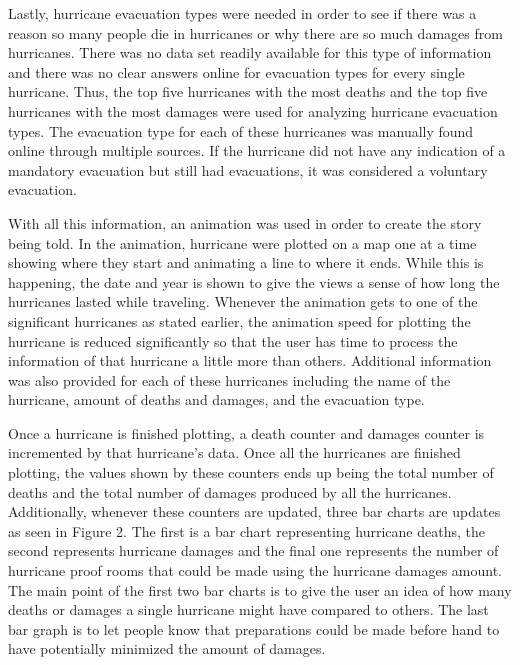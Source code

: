 Lastly, hurricane evacuation types were needed in order to see if there was a reason so many people die in hurricanes or why there are so much damages from hurricanes. There was no data set readily available for this type of information and there was no clear answers online for evacuation types for every single hurricane. Thus, the top five hurricanes with the most deaths and the top five hurricanes with the most damages were used for analyzing hurricane evacuation types. The evacuation type for each of these hurricanes was manually found online through multiple sources. If the hurricane did not have any indication of a mandatory evacuation but still had evacuations, it was considered a voluntary evacuation. 

With  all this information, an animation was used in order to create the story being told. In the animation, hurricane were plotted on a map one at a time showing where they start and animating a line to where it ends. While this is happening, the date and year is shown to give the views a sense of how long the hurricanes lasted while traveling. Whenever the animation gets to one of the significant hurricanes as stated earlier, the animation speed for plotting the hurricane is reduced significantly so that the user has time to process the information of that hurricane a little more than others. Additional information was also provided for each of these hurricanes including the name of the hurricane, amount of deaths and damages, and the evacuation type.

Once a hurricane is finished plotting, a death counter and damages counter is incremented by that hurricane's data. Once all the hurricanes are finished plotting, the values shown by these counters ends up being the total number of deaths and the total number of damages produced by all the hurricanes. Additionally, whenever these counters are updated, three bar charts are updates as seen in Figure 2. The first is a bar chart representing hurricane deaths, the second represents hurricane damages and the final one represents the number of hurricane proof rooms that could be made using the hurricane damages amount. The main point of the first two bar charts is to give the user an idea of how many deaths or damages a single hurricane might have compared to others. The last bar graph is to let people know that preparations could be made before hand to have potentially minimized the amount of damages.

\bars

